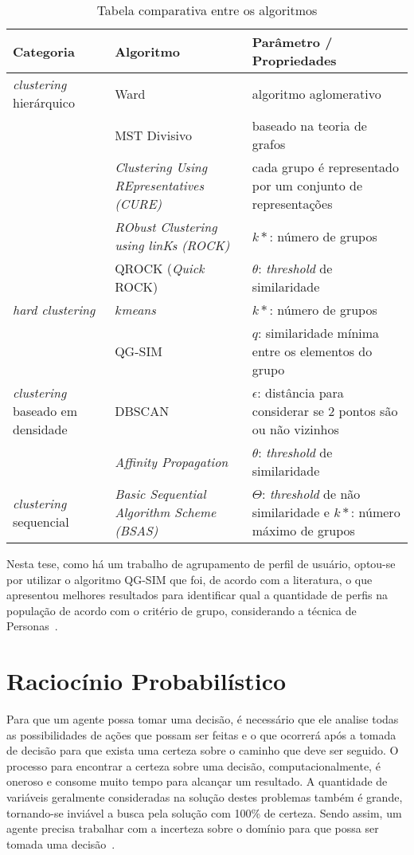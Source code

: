 \begin{table}[h!]
	\caption{Tabela comparativa entre os algoritmos}
	\label{tab:comp_algo_agrupamento}
	\begin{tabular}{ m{2.8cm} | m{5cm} | m{7cm} } \hline
	Categoria & Algoritmo & Parâmetro / Propriedades \\ \hline
	\emph{clustering} hierárquico & Ward & algoritmo aglomerativo \\ \hline
	& MST Divisivo & baseado na teoria de grafos \\ \hline
	& \emph{Clustering Using REpresentatives (CURE)} & cada grupo é representado por um conjunto de representações \\ \hline
	& \emph{RObust Clustering using linKs (ROCK)} & $k*$: número de grupos \\ \hline
	& QROCK (\emph{Quick} ROCK) & $\theta$: \emph{threshold} de similaridade  \\ \hline
	\emph{hard clustering} & $k$\emph{means} & $k*$: número de grupos \\ \hline
    & QG-SIM & $q$: similaridade mínima entre os elementos do grupo \\ \hline
	\emph{clustering} baseado em densidade & DBSCAN & $\epsilon$: distância para considerar se 2 pontos são ou não vizinhos \\ \hline
	& \emph{Affinity Propagation} & $\theta$: \emph{threshold} de similaridade  \\ \hline
	\emph{clustering} sequencial & \emph{Basic Sequential Algorithm Scheme (BSAS)} & $\Theta$: \emph{threshold} de não similaridade e $k*$: número máximo de grupos  \\ \hline
	\end{tabular}
\end{table}

Nesta tese, como há um trabalho de agrupamento de perfil de usuário, optou-se por utilizar o algoritmo QG-SIM que foi, de acordo com a literatura, o que apresentou melhores resultados para identificar qual a quantidade de perfis na população de acordo com o critério de grupo, considerando a técnica de Personas~\cite{masiero:2013}.

\section{Raciocínio Probabilístico}
\label{sec:raciocinio-probabilistico}
Para que um agente possa tomar uma decisão, é necessário que ele analise todas as possibilidades de ações que possam ser feitas e o que ocorrerá após a tomada de decisão para que exista uma certeza sobre o caminho que deve ser seguido. O processo para encontrar a certeza sobre uma decisão, computacionalmente, é oneroso e consome muito tempo para alcançar um resultado. A quantidade de variáveis geralmente consideradas na solução destes problemas também é grande, tornando-se inviável a busca pela solução com 100\% de certeza. Sendo assim, um agente precisa trabalhar com a incerteza sobre o domínio para que possa ser tomada uma decisão~\cite{russell:2002}.


